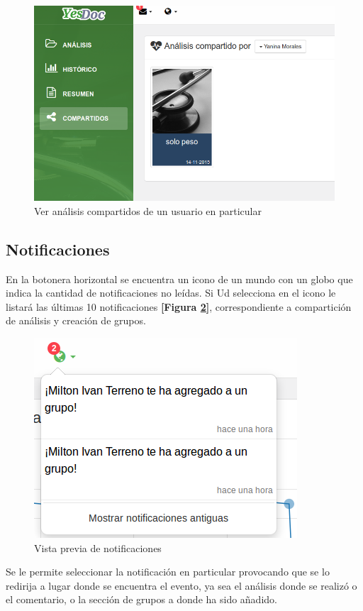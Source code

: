 \begin{figure}
	\centering
	\includegraphics[width=.8\textwidth]{img/manual_de_usuario/lista_compartidos}
	\caption{Ver análisis compartidos de un usuario en particular}
	\label{mu-lista_compartidos}
\end{figure}









\subsection{Notificaciones}
En la botonera horizontal se encuentra un icono de un mundo con un globo que indica la cantidad de notificaciones no leídas. Si Ud selecciona en el icono le listará las últimas 10 notificaciones \textbf{[Figura \ref{mu-notificaciones_vista_previa}]}, correspondiente a compartición de análisis y creación de grupos. 
\begin{figure}
	\centering
	\includegraphics[width=.8\textwidth]{img/manual_de_usuario/notificaciones_vista_previa}
	\caption{Vista previa de notificaciones}
	\label{mu-notificaciones_vista_previa}
\end{figure}
Se le permite seleccionar la notificación en particular provocando que se lo redirija a lugar donde se encuentra el evento, ya sea el análisis donde se realizó o el comentario, o la sección de grupos a donde ha sido añadido.

